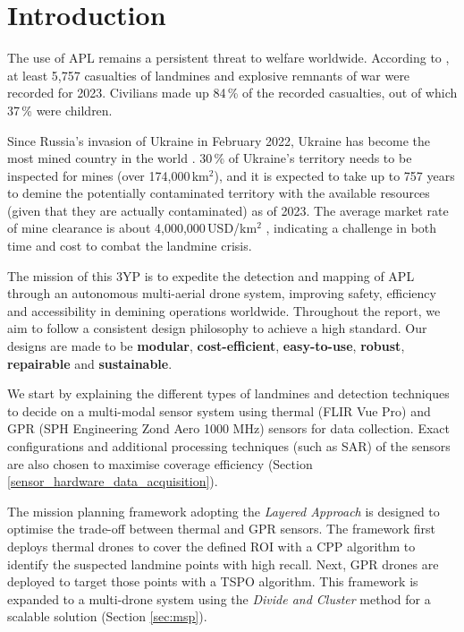 \section{Introduction} \label{introduction}

The use of \gls{APL} remains a persistent threat to welfare worldwide. According to \cite{icbl2024landmine}, at least 5,757 casualties of landmines and explosive remnants of war were recorded for 2023. Civilians made up 84\,\% of the recorded casualties, out of which 37\,\% were children. 

Since Russia's invasion of Ukraine in February 2022, Ukraine has become the most mined country in the world \cite{globsec2024ukraine}. 30\,\% of Ukraine's territory needs to be inspected for mines (over 174,000\,km$^2$), and it is expected to take up to 757 years to demine the potentially contaminated territory with the available resources (given that they are actually contaminated) as of 2023. The average market rate of mine clearance is about 4,000,000\,USD/km$^2$ \cite{globsec2023ukraine}, indicating a challenge in both time and cost to combat the landmine crisis. 

The mission of this \gls{3YP} is to expedite the detection and mapping of \gls{APL} through an autonomous multi-aerial drone system, improving safety, efficiency and accessibility in demining operations worldwide. Throughout the report, we aim to follow a consistent design philosophy to achieve a high standard. Our designs are made to be \textbf{modular}, \textbf{cost-efficient}, \textbf{easy-to-use}, \textbf{robust}, \textbf{repairable} and \textbf{sustainable}.

We start by explaining the different types of landmines and detection techniques to decide on a multi-modal sensor system using thermal (FLIR Vue Pro) and \gls{GPR} (SPH Engineering Zond Aero 1000 MHz) sensors for data collection. Exact configurations and additional processing techniques (such as \gls{SAR}) of the sensors are also chosen to maximise coverage efficiency (Section \ref{sensor_hardware_data_acquisition}). 

The mission planning framework adopting the \textit{Layered Approach} is designed to optimise the trade-off between thermal and \gls{GPR} sensors. The framework first deploys thermal drones to cover the defined \gls{ROI} with a \gls{CPP} algorithm to identify the suspected landmine points with high recall. Next, \gls{GPR} drones are deployed to target those points with a \gls{TSPO} algorithm. This framework is expanded to a multi-drone system using the \textit{Divide and Cluster} method for a scalable solution (Section \ref{sec:msp}). 

